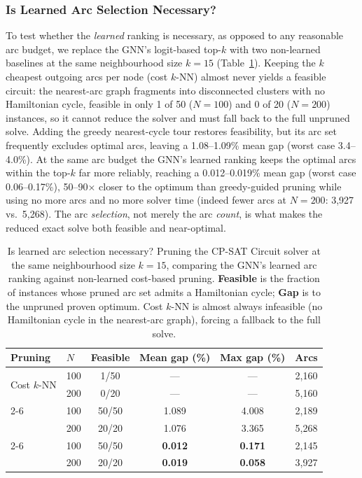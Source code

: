 \documentclass[review,times]{elsarticle}
\begin{document}
\subsubsection{Is Learned Arc Selection Necessary?}\label{sec:prune_ablation} To test whether the \emph{learned} ranking is necessary, as opposed to any reasonable arc budget, we replace the GNN's logit-based top-$k$ with two non-learned baselines at the same neighbourhood size $k{=}15$ (Table~\ref{tab:pruning_ablation}). Keeping the $k$ cheapest outgoing arcs per node (cost $k$-NN) almost never yields a feasible circuit: the nearest-arc graph fragments into disconnected clusters with no Hamiltonian cycle, feasible in only 1 of 50 ($N{=}100$) and 0 of 20 ($N{=}200$) instances, so it cannot reduce the solver and must fall back to the full unpruned solve. Adding the greedy nearest-cycle tour restores feasibility, but its arc set frequently excludes optimal arcs, leaving a 1.08--1.09\% mean gap (worst case 3.4--4.0\%). At the same arc budget the GNN's learned ranking keeps the optimal arcs within the top-$k$ far more reliably, reaching a 0.012--0.019\% mean gap (worst case 0.06--0.17\%), 50--90$\times$ closer to the optimum than greedy-guided pruning while using no more arcs and no more solver time (indeed fewer arcs at $N{=}200$: 3{,}927 vs.\ 5{,}268). The arc \emph{selection}, not merely the arc \emph{count}, is what makes the reduced exact solve both feasible and near-optimal.

\begin{table}[htbp]
\caption{Is learned arc selection necessary? Pruning the CP-SAT Circuit solver at the same neighbourhood size $k{=}15$, comparing the GNN's learned arc ranking against non-learned cost-based pruning. \textbf{Feasible} is the fraction of instances whose pruned arc set admits a Hamiltonian cycle; \textbf{Gap} is to the unpruned proven optimum. Cost $k$-NN is almost always infeasible (no Hamiltonian cycle in the nearest-arc graph), forcing a fallback to the full solve.}
\label{tab:pruning_ablation}
\centering
\begin{tabular}{@{}llcccc@{}}
\toprule
\textbf{Pruning} & \textbf{$N$} & \textbf{Feasible} & \textbf{Mean gap (\%)} & \textbf{Max gap (\%)} & \textbf{Arcs} \\
\midrule
\multirow{2}{*}{Cost $k$-NN}
    & 100 & 1/50 & --- & --- & 2{,}160 \\
    & 200 & 0/20 & --- & --- & 5{,}160 \\
\cmidrule(l){2-6}
\multirow{2}{*}{Cost $k$-NN $+$ greedy}
    & 100 & 50/50 & 1.089 & 4.008 & 2{,}189 \\
    & 200 & 20/20 & 1.076 & 3.365 & 5{,}268 \\
\cmidrule(l){2-6}
\multirow{2}{*}{GNN (LEAP)}
    & 100 & 50/50 & \textbf{0.012} & \textbf{0.171} & 2{,}145 \\
    & 200 & 20/20 & \textbf{0.019} & \textbf{0.058} & 3{,}927 \\
\bottomrule
\end{tabular}
\end{table}
\end{document}
